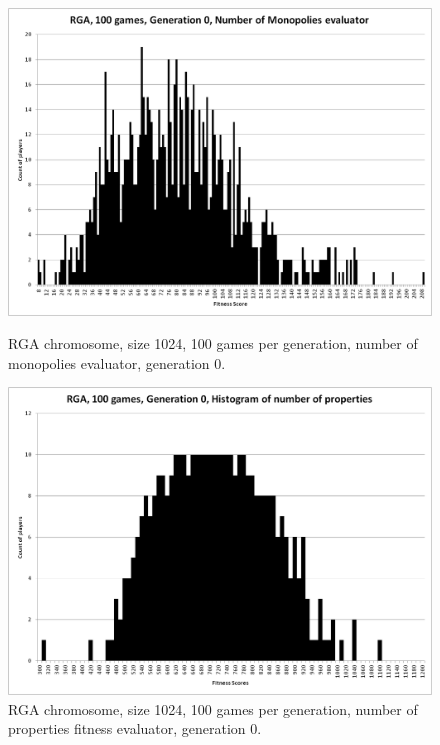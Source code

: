 \begin{figure}
\begin{minipage}[t]{0.47\linewidth}
\centering
\includegraphics[width=1.0\linewidth]{Figures/RGA_1024_G000_N100_NM.png}
\caption[RGA Num Monopolies Fitness Distribution, Initial Generation]{RGA
chromosome, size 1024, 100 games per generation, number of monopolies
evaluator, generation 0.}
\label{figure-RGA-G000-N100-NM-initial_fitness}
\end{minipage}%
\hspace{0.06\linewidth}%
\begin{minipage}[t]{0.47\linewidth}
\centering
\includegraphics[width=1.0\linewidth]{Figures/RGA_1024_G000_N100_NP.png}
\caption[RGA Num Properties Fitness Distribution, Initial Generation]{RGA
chromosome, size 1024, 100 games per generation, number of properties fitness
evaluator, generation 0.}
\label{figure-RGA-G000-N100-NP-initial_fitness}

\end{minipage}
\end{figure}

